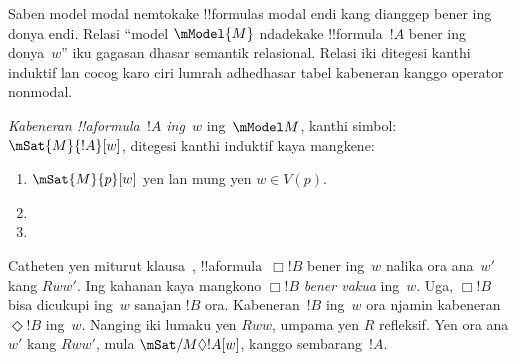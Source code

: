 \documentclass[../../../include/open-logic-section]{subfiles}
\begin{document}


Saben model modal nemtokake !!{formula}s modal endi kang dianggep
bener ing donya endi. Relasi ``model $\mModel{M}$ ndadekake
!!{formula}~$!A$ bener ing donya~$w$'' iku gagasan dhasar semantik
relasional. Relasi iki ditegesi kanthi induktif lan cocog karo
ciri lumrah adhedhasar tabel kabeneran kanggo operator nonmodal.

\begin{defn}
  \emph{Kabeneran !!a{formula}~$!A$ ing~$w$} ing~$\mModel M$, kanthi simbol:
  $\mSat{M}{!A}[w]$, ditegesi kanthi induktif kaya mangkene:
  \begin{enumerate}
  \item $\mSat{M}{p}[w]$ yen lan mung yen $w \in V(p)$.
  \item{}
  \item{}
  \end{enumerate}
\end{defn}

Catheten yen miturut klausa~,
!!a{formula}~$\Box !B$ bener ing~$w$ nalika ora ana~$w'$ kang
$Rww'$. Ing kahanan kaya mangkono $\Box !B$ \emph{bener vakua}
ing~$w$. Uga, $\Box !B$ bisa dicukupi ing~$w$ sanajan $!B$
ora. Kabeneran~$!B$ ing~$w$ ora njamin kabeneran~$\Diamond !B$
ing~$w$. Nanging iki lumaku yen $Rww$, umpama yen $R$ refleksif.
Yen ora ana $w'$ kang $Rww'$, mula $\mSat/{M}{\Diamond !A}[w]$,
kanggo sembarang~$!A$.
\end{document}

